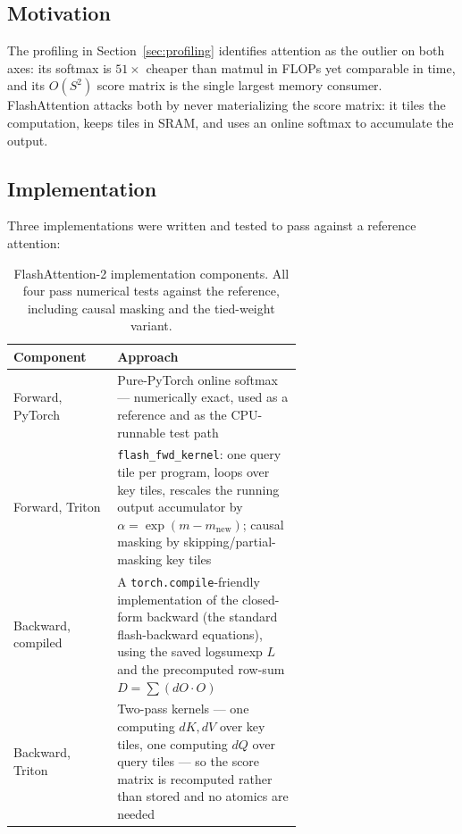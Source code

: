 \documentclass{article}
\begin{document}
\subsection{Motivation}

The profiling in Section~\ref{sec:profiling} identifies attention as the outlier on both axes: its softmax is $51\times$ cheaper than matmul in FLOPs yet comparable in time, and its $O(S^2)$ score matrix is the single largest memory consumer. FlashAttention \cite{flash1,flash2} attacks both by never materializing the score matrix: it tiles the computation, keeps tiles in SRAM, and uses an online softmax to accumulate the output.

\subsection{Implementation}

Three implementations were written and tested to pass against a reference attention:

\begin{table}[t]
  \caption{FlashAttention-2 implementation components. All four pass numerical tests against the reference, including causal masking and the tied-weight variant.}
  \label{tab:flash}
  \centering
  \small
  \begin{tabular}{@{}lp{0.64\linewidth}@{}}
    \toprule
    Component & Approach \\
    \midrule
    Forward, PyTorch & Pure-PyTorch online softmax --- numerically exact, used as a reference and as the CPU-runnable test path \\
    Forward, Triton & \texttt{flash\_fwd\_kernel}: one query tile per program, loops over key tiles, rescales the running output accumulator by $\alpha = \exp(m - m_{\text{new}})$; causal masking by skipping/partial-masking key tiles \\
    Backward, compiled & A \texttt{torch.compile}-friendly implementation of the closed-form backward (the standard flash-backward equations), using the saved logsumexp $L$ and the precomputed row-sum $D = \sum (dO \cdot O)$ \\
    Backward, Triton & Two-pass kernels --- one computing $dK, dV$ over key tiles, one computing $dQ$ over query tiles --- so the score matrix is recomputed rather than stored and no atomics are needed \\
    \bottomrule
  \end{tabular}
\end{table}
\end{document}
